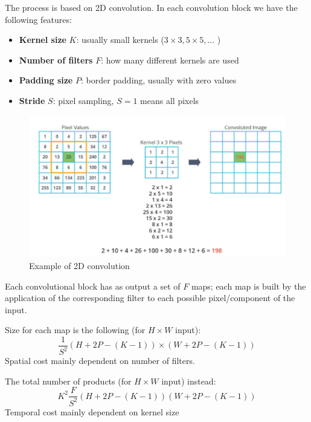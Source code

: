 \begin{paracol}{2}
   
   The process is based on 2D convolution.
   In each convolution block we have the following features:
   \begin{itemize}
      \item \textbf{Kernel size} $K$: usually small kernels ($3\times 3, 5\times 5, \dots$ )
      \item \textbf{Number of filters} $F$: how many different kernels are used
      \item \textbf{Padding size} $P$: border padding, usually with zero values
      \item \textbf{Stride} $S$: pixel sampling, $S = 1$ means all pixels
   \end{itemize}

   \switchcolumn

   \begin{figure}[htbp]
      \centering
      \includegraphics{images/10/convolution2d.png}
      \caption{Example of 2D convolution}
      \label{fig:10/convolution2d}
   \end{figure}
\end{paracol}

Each convolutional block has as output a set of $F$ maps; 
each map is built by the application of the corresponding filter to each possible pixel/component of the input.
\nl

Size for each map is the following (for $H\times W$ input):
\[\frac{1}{S^2} (H + 2P - (K - 1))\times(W + 2P - (K-1))\]
Spatial cost mainly dependent on number of filters.
\nl

The total number of products (for $H\times W$ input) instead: 
\[K^2\frac{F}{S^2} (H + 2P - (K - 1))(W + 2P - (K-1))\]
Temporal cost mainly dependent on kernel size

